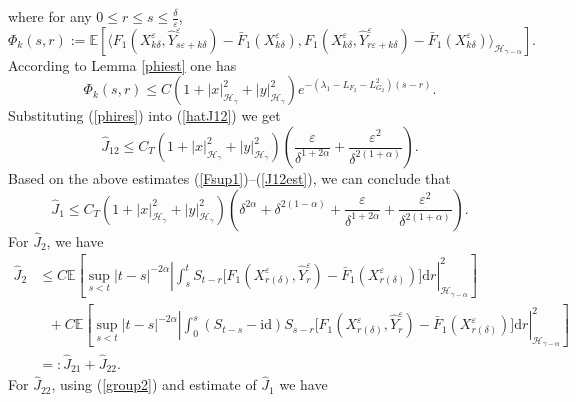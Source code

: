 \documentclass[10pt,a4paper]{article}
\numberwithin{equation}{section}
\begin{document}
where for any $0 \leq r \leq s \leq \frac \delta \varepsilon$,
\begin{equation}\label{phi}
	\Phi_k(s,r):=\mathbb E \left[ \langle F_1(X_{k\delta}^\varepsilon,\hat{Y}_{s\varepsilon+k\delta}^\varepsilon)-\bar{F}_1(X_{k\delta}^\varepsilon),F_1(X_{k\delta}^\varepsilon,\hat{Y}_{r\varepsilon+k\delta}^\varepsilon)-\bar{F}_1(X_{k\delta}^\varepsilon) \rangle_{\mathcal H_{\gamma-\alpha}} \right].
\end{equation}
According to Lemma \ref{phiest} one has
\begin{equation}\label{phires}
\Phi_k(s,r) \leq C (1+|x|_{\mathcal H_\gamma}^2+| y |_{\mathcal H_\gamma }^2) e^{-(\lambda_1-L_{F_2}-L_{G_2}^2)(s-r)}.
\end{equation}
Substituting (\ref{phires}) into (\ref{hatJ12}) we get
\begin{equation}\label{J12est}
\hat{J}_{12} \leq C_T (1+|x|_{\mathcal H_\gamma}^2+| y |_{\mathcal H_\gamma }^2) \left(\frac {\varepsilon} {\delta^{1+2\alpha}} +\frac {\varepsilon^2} {\delta^{2(1+\alpha)}}  \right).	
\end{equation}
Based on the above estimates (\ref{Fsup1})--(\ref{J12est}), we can conclude that
\begin{equation}\label{J1res}
\hat{J}_1 \leq C_T(1+|x|_{\mathcal H_\gamma}^2+| y |_{\mathcal H_\gamma }^2) \left(\delta^{2\alpha}+\delta^{2(1-\alpha)}+\frac {\varepsilon} {\delta^{1+2\alpha}} +\frac {\varepsilon^2} {\delta^{2(1+\alpha)}}  \right).	
\end{equation}
For $\hat{J}_2$, we have
\begin{align*}
\hat{J}_2 & \leq C \mathbb E \left[ \sup_{s<t} |t-s|^{-2\alpha} \left| \int_s^t S_{t-r} \big[ F_1(X_{r(\delta)}^\varepsilon,\hat{Y}_r^\varepsilon)-\bar{F}_1(X_{r(\delta)}^\varepsilon) \big] \mathrm{d} r \right|_{\mathcal H_{\gamma-\alpha} }^2 \right]	 \nonumber\\
&~~~+ C \mathbb E \left[ \sup_{s<t} |t-s|^{-2\alpha} \left| \int_0^s (S_{t-s}-\mathrm{id}) S_{s-r}\big[ F_1(X_{r(\delta)}^\varepsilon,\hat{Y}_r^\varepsilon)-\bar{F}_1(X_{r(\delta)}^\varepsilon) \big] \mathrm{d} r \right|_{\mathcal H_{\gamma-\alpha} }^2 \right] \nonumber\\
&=: \hat{J}_{21}+\hat{J}_{22}.
\end{align*}
For $\hat{J}_{22}$, using (\ref{group2}) and estimate of $\hat{J}_1$ we have
\end{document}
